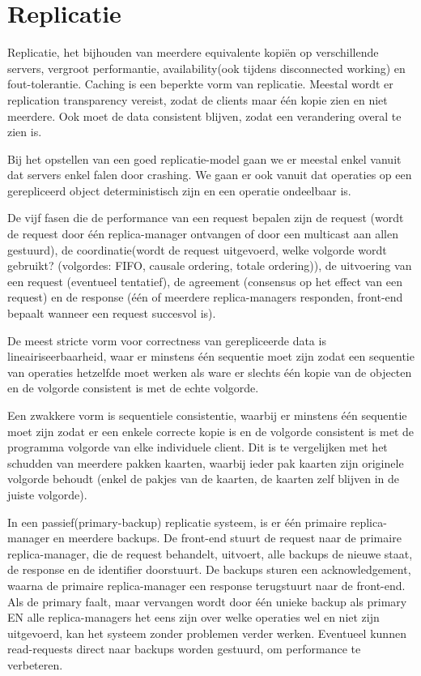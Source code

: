 \documentclass[../samenvatting.tex]{subfiles}
\begin{document}
\chapter{Replicatie}
Replicatie, het bijhouden van meerdere equivalente kopiën op verschillende servers, vergroot performantie, availability(ook tijdens disconnected working) en fout-tolerantie. Caching is een beperkte vorm van replicatie. Meestal wordt er replication transparency vereist, zodat de clients maar één kopie zien en niet meerdere. Ook moet de data consistent blijven, zodat een verandering overal te zien is.

Bij het opstellen van een goed replicatie-model gaan we er meestal enkel vanuit dat servers enkel falen door crashing. We gaan er ook vanuit dat operaties op een gerepliceerd object deterministisch zijn en een operatie ondeelbaar is. 

De vijf fasen die de performance van een request bepalen zijn de request (wordt de request door één replica-manager ontvangen of door een multicast aan allen gestuurd), de coordinatie(wordt de request uitgevoerd, welke volgorde wordt gebruikt? (volgordes: FIFO, causale ordering, totale ordering)), de uitvoering van een request (eventueel tentatief), de agreement (consensus op het effect van een request) en de response (één of meerdere replica-managers responden, front-end bepaalt wanneer een request succesvol is).

De meest stricte vorm voor correctness van gerepliceerde data is lineairiseerbaarheid, waar er minstens één sequentie moet zijn zodat een sequentie van operaties hetzelfde moet werken als ware er slechts één kopie van de objecten en de volgorde consistent is met de echte volgorde.

Een zwakkere vorm is sequentiele consistentie, waarbij er minstens één sequentie moet zijn zodat er een enkele correcte kopie is en de volgorde consistent is met de programma volgorde van elke individuele client. Dit is te vergelijken met het schudden van meerdere pakken kaarten, waarbij ieder pak kaarten zijn originele volgorde behoudt (enkel de pakjes van de kaarten, de kaarten zelf blijven in de juiste volgorde).

In een passief(primary-backup) replicatie systeem, is er één primaire replica-manager en meerdere backups. De front-end stuurt de request naar de primaire replica-manager, die de request behandelt, uitvoert, alle backups de nieuwe staat, de response en de identifier doorstuurt. De backups sturen een acknowledgement, waarna de primaire replica-manager een response terugstuurt naar de front-end. Als de primary faalt, maar vervangen wordt door één unieke backup als primary EN alle replica-managers het eens zijn over welke operaties wel en niet zijn uitgevoerd, kan het systeem zonder problemen verder werken. Eventueel kunnen read-requests direct naar backups worden gestuurd, om performance te verbeteren.
\end{document}

